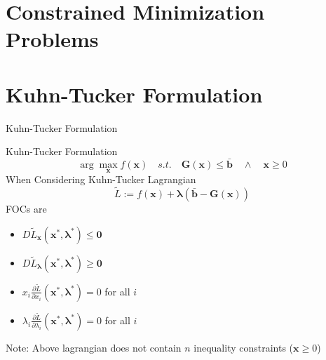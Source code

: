 \documentclass[a4paper,11pt]{article}
\newcommand{\bd}{\mathbf}
\newcommand{\p}{\partial}
\begin{document}
\section{Constrained Minimization Problems} %
\label{sec:constrained_minimization_problems}

\section{Kuhn-Tucker Formulation} %
\label{sec:kuhn_tucker_formulation}
\begin{frame}[t]{Kuhn-Tucker Formulation}
	\begin{block}
		{Kuhn-Tucker Formulation}
		\[
			\arg\max_\bd{x} f(\bd{x}) \quad s.t.\quad \bd{G}(\bd{x})\le \bar{\bd{b}} \quad\land\quad \bd{x}\ge 0
		\] When Considering Kuhn-Tucker Lagrangian\[
			\tilde{L}:=f(\bd{x})+\bd{\lambda}(\bar{\bd{b}}-\bd{G}(\bd{x}))
		\]
		FOCs are
		\begin{itemize}
			\item $D\tilde{L}_{\bd{x}}(\bd{x^\ast},\bd{\lambda^\ast})\le \bd{0}$
			\item $D\tilde{L}_{\bd{\lambda}}(\bd{x^\ast},\bd{\lambda^\ast})\ge \bd{0}$
			\item $x_i \frac{\p \tilde L}{\p x_i}(\bd{x^\ast,\lambda^\ast})=0$ for all $i$
			\item $\lambda_i \frac{\p \tilde L}{\p \lambda_i}(\bd{x^\ast,\lambda^\ast})=0$ for all $i$
		\end{itemize}
	\end{block}
	Note: Above lagrangian does not contain $n$ inequality constraints ($\bd{x}\ge 0$)
\end{frame}
\end{document}
